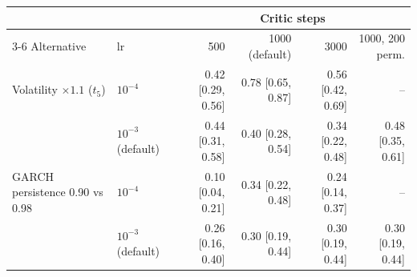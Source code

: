 \begin{tabular}{llrrrr}
\toprule
 &  & \multicolumn{4}{c}{Critic steps} \\
\cmidrule(lr){3-6}
Alternative & lr & 500 & 1000 (default) & 3000 & 1000, 200 perm. \\
\midrule
Volatility $\times1.1$ ($t_5$) & $10^{-4}$ & 0.42 [0.29, 0.56] & 0.78 [0.65, 0.87] & 0.56 [0.42, 0.69] & -- \\
 & $10^{-3}$ (default) & 0.44 [0.31, 0.58] & 0.40 [0.28, 0.54] & 0.34 [0.22, 0.48] & 0.48 [0.35, 0.61] \\
GARCH persistence 0.90 vs 0.98 & $10^{-4}$ & 0.10 [0.04, 0.21] & 0.34 [0.22, 0.48] & 0.24 [0.14, 0.37] & -- \\
 & $10^{-3}$ (default) & 0.26 [0.16, 0.40] & 0.30 [0.19, 0.44] & 0.30 [0.19, 0.44] & 0.30 [0.19, 0.44] \\
\bottomrule
\end{tabular}
